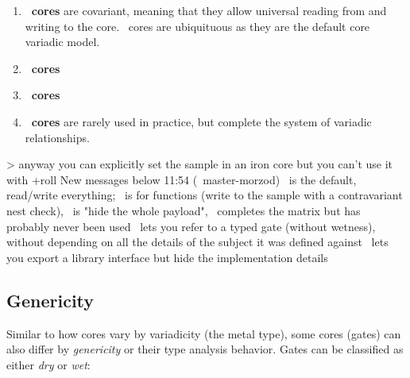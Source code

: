 \begin{enumerate}
  \item  \textbf{\gold~cores} are covariant, meaning that they allow universal reading from and writing to the core.  \gold~cores are ubiquituous as they are the default core variadic model.
  \item  \textbf{\iron~cores}
  \item  \textbf{\lead~cores}
  \item  \textbf{\zinc~cores} are rarely used in practice, but complete the system of variadic relationships.
\end{enumerate}

> anyway you can explicitly set the sample in an iron core
but you can't use it with +roll
New messages below
11:54 (~master-morzod)
\gold~is the default, read/write everything; \iron~is for functions (write to the sample with a contravariant nest check), \lead~is "hide the whole payload", \zinc~completes the matrix
but has probably never been used
\iron~lets you refer to a typed gate (without wetness), without depending on all the details of the subject it was defined against
\lead~lets you export a library interface but hide the implementation details

\subsection{Genericity}

Similar to how cores vary by variadicity (the metal type), some cores (gates) can also differ by \emph{genericity} or their type analysis behavior.  Gates can be classified as either \emph{dry} or \emph{wet}:

